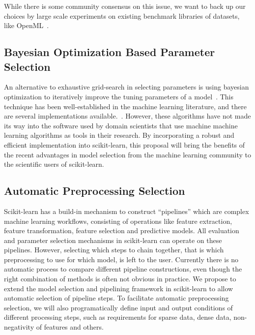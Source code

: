 While there is some community consensus on this issue, we want to back
up our choices by large scale experiments on existing benchmark libraries
of datasets, like OpenML~\cite{van2013openml}.

\subsection{Bayesian Optimization Based Parameter Selection}
An alternative to exhaustive grid-search in selecting parameters is using
bayesian optimization to iteratively improve the tuning parameters of a model~\cite{NIPS2011_4443, shahriari2016taking, NIP2012_4522}.
This technique has been well-established in the machine learning literature,
and there are several implementations available.~\cite{bergstra2013hyperopt, feurer-nips2015, komer2014hyperopt, snoek2015scalable}.
However, these algorithms have not made its way into the software used by
domain scientists that use machine machine learning algorithms as tools in
their research.
By incorporating a robust and efficient implementation into scikit-learn,
this proposal will bring the benefits of the recent advantages in model selection
from the machine learning community to the scientific users of scikit-learn.

\subsection{Automatic Preprocessing Selection}
Scikit-learn has a build-in mechanism to construct ``pipelines'' which are complex 
machine learning workflows, consisting of operations like feature extraction,
feature transformation, feature selection and predictive models.
All evaluation and parameter selection mechanisms in scikit-learn can operate
on these pipelines.
However, selecting which steps to chain together, that is which preprocessing
to use for which model, is left to the user. Currently there is no
automatic process to compare different pipeline constructions, even though
the right combination of methods is often not obvious in practice.
We propose to extend the model selection and pipelining framework in scikit-learn
to allow automatic selection of pipeline steps.
To facilitate automatic preprocessing selection, we will also programatically
define input and output conditions of different processing steps, such
as requirements for sparse data, dense data, non-negativity of features and others.

